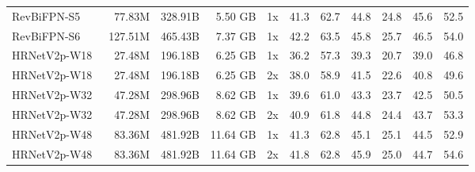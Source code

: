 \documentclass{article}
\begin{document}
\begin{table*}
{\begin{tabular}{lrrrrrrrrrr}
        RevBiFPN-S5                         \hspace{-10pt} &  77.83M & 328.91B &  5.50 GB & \hspace{-6pt} 1x \hspace{-5pt} & 41.3 &      62.7 &      44.8 &     24.8 &     45.6 &     52.5 \\ 
        RevBiFPN-S6                         \hspace{-10pt} & 127.51M & 465.43B &  7.37 GB & \hspace{-6pt} 1x \hspace{-5pt} & 42.2 &      63.5 &      45.8 &     25.7 &     46.5 &     54.0 \\ \midrule
        HRNetV2p-W18~\cite{wang2020hrnet}   \hspace{-10pt} &  27.48M & 196.18B &  6.25 GB & \hspace{-6pt} 1x \hspace{-5pt} & 36.2 &      57.3 &      39.3 &     20.7 &     39.0 &     46.8 \\
        HRNetV2p-W18~\cite{wang2020hrnet}   \hspace{-10pt} &  27.48M & 196.18B &  6.25 GB & \hspace{-6pt} 2x \hspace{-5pt} & 38.0 &      58.9 &      41.5 &     22.6 &     40.8 &     49.6 \\
        HRNetV2p-W32~\cite{wang2020hrnet}   \hspace{-10pt} &  47.28M & 298.96B &  8.62 GB & \hspace{-6pt} 1x \hspace{-5pt} & 39.6 &      61.0 &      43.3 &     23.7 &     42.5 &     50.5 \\ 
        HRNetV2p-W32~\cite{wang2020hrnet}   \hspace{-10pt} &  47.28M & 298.96B &  8.62 GB & \hspace{-6pt} 2x \hspace{-5pt} & 40.9 &      61.8 &      44.8 &     24.4 &     43.7 &     53.3 \\ 
        HRNetV2p-W48~\cite{wang2020hrnet}   \hspace{-10pt} &  83.36M & 481.92B & 11.64 GB & \hspace{-6pt} 1x \hspace{-5pt} & 41.3 &      62.8 &      45.1 &     25.1 &     44.5 &     52.9 \\ 
        HRNetV2p-W48~\cite{wang2020hrnet}   \hspace{-10pt} &  83.36M & 481.92B & 11.64 GB & \hspace{-6pt} 2x \hspace{-5pt} & 41.8 &      62.8 &      45.9 &     25.0 &     44.7 &     54.6 \\ \midrule

\end{tabular}}
\end{table*}
\end{document}
